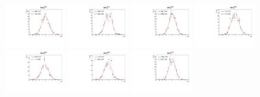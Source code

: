 \begin{figure}[h]\centering
    \includegraphics[width=0.24\textwidth]{figure/io/polarization/pull_polarization_delta0_4600.pdf}
    \includegraphics[width=0.24\textwidth]{figure/io/polarization/pull_polarization_delta0_4612.pdf}
    \includegraphics[width=0.24\textwidth]{figure/io/polarization/pull_polarization_delta0_4626.pdf}
    \includegraphics[width=0.24\textwidth]{figure/io/polarization/pull_polarization_delta0_4640.pdf}
    \includegraphics[width=0.24\textwidth]{figure/io/polarization/pull_polarization_delta0_4660.pdf}
    \includegraphics[width=0.24\textwidth]{figure/io/polarization/pull_polarization_delta0_4680.pdf}
    \includegraphics[width=0.24\textwidth]{figure/io/polarization/pull_polarization_delta0_4700.pdf}

\end{figure}
